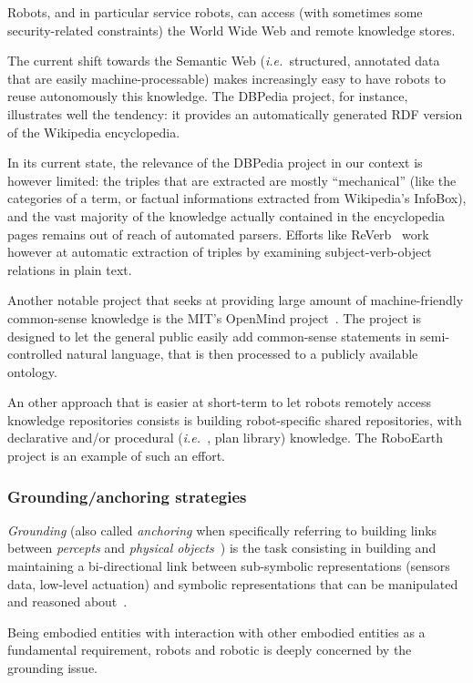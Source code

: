 \documentclass[a4paper, twocolumn]{article}
\newcommand{\ie}{{\textit{i.e.\ }}}
\begin{document}
Robots, and in particular service robots, can access (with sometimes some
security-related constraints) the World Wide Web and remote knowledge stores.

The current shift towards the Semantic Web (\ie structured, annotated data that
are easily machine-processable) makes increasingly easy to have robots to reuse
autonomously this knowledge. The DBPedia project, for instance, illustrates
well the tendency: it provides an automatically generated RDF version of the
Wikipedia encyclopedia.

In its current state, the relevance of the DBPedia project in our context is
however limited: the triples that are extracted are mostly ``mechanical'' (like
the categories of a term, or factual informations extracted from Wikipedia's
InfoBox), and the vast majority of the knowledge actually contained in the
encyclopedia pages remains out of reach of automated parsers. Efforts like {\sc
ReVerb}~\cite{Fader2011} work however at automatic extraction of triples by
examining subject-verb-object relations in plain text.

Another notable project that seeks at providing large amount of
machine-friendly common-sense knowledge is the MIT's OpenMind
project~\cite{Singh2002}. The project is designed to let the general public
easily add common-sense statements in semi-controlled natural language, that is
then processed to a publicly available ontology.

An other approach that is easier at short-term to let robots remotely access
knowledge repositories consists is building robot-specific shared repositories,
with declarative and/or procedural (\ie, plan library) knowledge. The
RoboEarth~\cite{Waibel2011} project is an example of such an effort.

\subsubsection{Grounding/anchoring strategies}
\label{sect|grounding}

\emph{Grounding} (also called \emph{anchoring} when specifically referring to
building links between \emph{percepts} and \emph{physical
objects}~\cite{Coradeschi2003}) is the task consisting in building and
maintaining a bi-directional link between sub-symbolic representations (sensors
data, low-level actuation) and symbolic representations that can be
manipulated and reasoned about~\cite{Harnad1990}.

Being embodied entities with interaction with other embodied entities as a
fundamental requirement, robots and robotic is deeply concerned by the
grounding issue.
\end{document}
